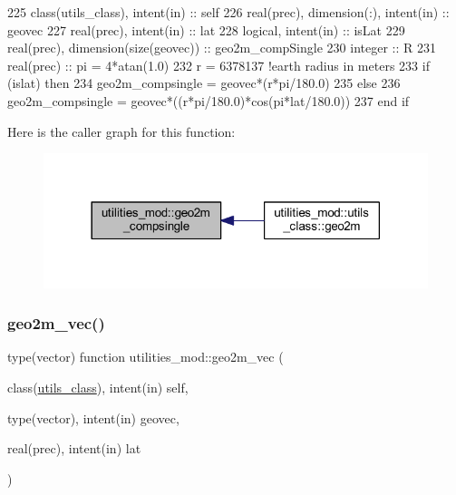 \begin{DoxyCode}
225     \textcolor{keywordtype}{class}(utils\_class), \textcolor{keywordtype}{intent(in)} :: self
226     \textcolor{keywordtype}{real(prec)}, \textcolor{keywordtype}{dimension(:)}, \textcolor{keywordtype}{intent(in)} :: geovec
227     \textcolor{keywordtype}{real(prec)}, \textcolor{keywordtype}{intent(in)} :: lat
228     \textcolor{keywordtype}{logical}, \textcolor{keywordtype}{intent(in)} :: isLat
229     \textcolor{keywordtype}{real(prec)}, \textcolor{keywordtype}{dimension(size(geovec))} :: geo2m\_compSingle
230     \textcolor{keywordtype}{integer} :: R
231     \textcolor{keywordtype}{real(prec)} :: pi = 4*atan(1.0)
232     r = 6378137 \textcolor{comment}{!earth radius in meters}
233     \textcolor{keywordflow}{if} (islat) \textcolor{keywordflow}{then}
234         geo2m\_compsingle = geovec*(r*pi/180.0)
235     \textcolor{keywordflow}{else}
236         geo2m\_compsingle = geovec*((r*pi/180.0)*cos(pi*lat/180.0))
237 \textcolor{keywordflow}{    end if}
\end{DoxyCode}
Here is the caller graph for this function\+:\nopagebreak
\begin{figure}[H]
\begin{center}
\leavevmode
\includegraphics[width=318pt]{namespaceutilities__mod_a58dd5ed30b8ee9b9e1b43af96c119d28_icgraph}
\end{center}
\end{figure}
\mbox{\label{namespaceutilities__mod_a3d3d0e1568b178cd3e0bb8013642946c}} 
\subsubsection{\texorpdfstring{geo2m\+\_\+vec()}{geo2m\_vec()}}
{\footnotesize\ttfamily type(vector) function utilities\+\_\+mod\+::geo2m\+\_\+vec (\begin{DoxyParamCaption}\item[{class(\mbox{\hyperlink{structutilities__mod_1_1utils__class}{utils\+\_\+class}}), intent(in)}]{self,  }\item[{type(vector), intent(in)}]{geovec,  }\item[{real(prec), intent(in)}]{lat }\end{DoxyParamCaption})\hspace{0.3cm}{\ttfamily [private]}}



